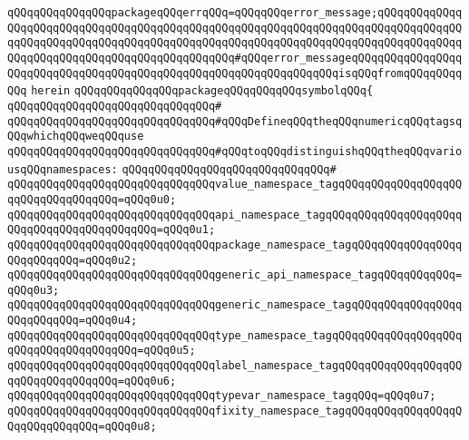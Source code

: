 \verb|qQQqqQQqqQQqqQQqpackageqQQqerrqQQq=qQQqqQQqerror_message;qQQqqQQqqQQqqQQqqQQqqQQqqQQqqQQqqQQqqQQqqQQqqQQqqQQqqQQqqQQqqQQqqQQqqQQqqQQqqQQqqQQqqQQqqQQqqQQqqQQqqQQqqQQqqQQqqQQqqQQqqQQqqQQqqQQqqQQqqQQqqQQqqQQqqQQqqQQqqQQqqQQqqQQqqQQqqQQqqQQqqQQqqQQq#qQQqerror_messageqQQqqQQqqQQqqQQqqQQqqQQqqQQqqQQqqQQqqQQqqQQqqQQqqQQqqQQqqQQqqQQqqQQqisqQQqfromqQQqqQQqqQQq|\newline
\verb|herein|\newline
\newline
\verb|qQQqqQQqqQQqqQQqpackageqQQqqQQqqQQqsymbolqQQq{|\newline
\verb|qQQqqQQqqQQqqQQqqQQqqQQqqQQqqQQq#|\newline
\newline
\verb|qQQqqQQqqQQqqQQqqQQqqQQqqQQqqQQq#qQQqDefineqQQqtheqQQqnumericqQQqtagsqQQqwhichqQQqweqQQquse|\newline
\verb|qQQqqQQqqQQqqQQqqQQqqQQqqQQqqQQq#qQQqtoqQQqdistinguishqQQqtheqQQqvariousqQQqnamespaces:|\newline
\verb|qQQqqQQqqQQqqQQqqQQqqQQqqQQqqQQq#|\newline
\verb|qQQqqQQqqQQqqQQqqQQqqQQqqQQqqQQqvalue_namespace_tagqQQqqQQqqQQqqQQqqQQqqQQqqQQqqQQqqQQq=qQQq0u0;|\newline
\verb|qQQqqQQqqQQqqQQqqQQqqQQqqQQqqQQqapi_namespace_tagqQQqqQQqqQQqqQQqqQQqqQQqqQQqqQQqqQQqqQQqqQQq=qQQq0u1;|\newline
\verb|qQQqqQQqqQQqqQQqqQQqqQQqqQQqqQQqpackage_namespace_tagqQQqqQQqqQQqqQQqqQQqqQQqqQQq=qQQq0u2;|\newline
\verb|qQQqqQQqqQQqqQQqqQQqqQQqqQQqqQQqgeneric_api_namespace_tagqQQqqQQqqQQq=qQQq0u3;|\newline
\verb|qQQqqQQqqQQqqQQqqQQqqQQqqQQqqQQqgeneric_namespace_tagqQQqqQQqqQQqqQQqqQQqqQQqqQQq=qQQq0u4;|\newline
\verb|qQQqqQQqqQQqqQQqqQQqqQQqqQQqqQQqtype_namespace_tagqQQqqQQqqQQqqQQqqQQqqQQqqQQqqQQqqQQqqQQq=qQQq0u5;|\newline
\verb|qQQqqQQqqQQqqQQqqQQqqQQqqQQqqQQqlabel_namespace_tagqQQqqQQqqQQqqQQqqQQqqQQqqQQqqQQqqQQq=qQQq0u6;|\newline
\verb|qQQqqQQqqQQqqQQqqQQqqQQqqQQqqQQqtypevar_namespace_tagqQQq=qQQq0u7;|\newline
\verb|qQQqqQQqqQQqqQQqqQQqqQQqqQQqqQQqfixity_namespace_tagqQQqqQQqqQQqqQQqqQQqqQQqqQQqqQQq=qQQq0u8;|\newline
\newline
